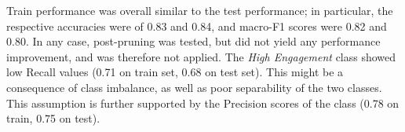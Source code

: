 Train performance was overall similar to the test performance; in particular, the respective accuracies
were of 0.83 and 0.84, and macro-F1 scores were 0.82 and 0.80.
In any case, post-pruning was tested, but did not yield any performance improvement, and was therefore
not applied.
The \textit{High Engagement} class showed low Recall values (0.71 on train set, 0.68 on test set).
This might be a consequence of class imbalance, as well as poor separability of the two classes.
This assumption is further supported by the
Precision scores of the class (0.78 on train, 0.75 on test).


